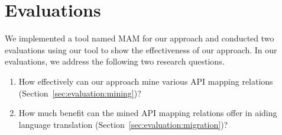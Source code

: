 \section{Evaluations}
\label{sec:evaluation}

We implemented a tool named MAM for our approach and
conducted two evaluations using our tool to show the effectiveness
of our approach. In our evaluations, we address the following
two research questions.

\vspace*{-1.5ex}\begin{enumerate}
\item How effectively can our approach mine various API mapping relations
(Section~\ref{sec:evaluation:mining})? \vspace*{-1.5ex}
\item How much benefit can the mined API mapping relations offer in aiding language
translation (Section~\ref{sec:evaluation:migration})?\vspace*{-1.5ex}
\end{enumerate}%
